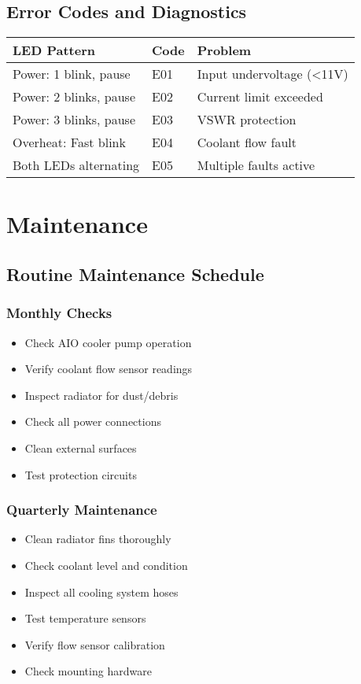 \documentclass[11pt,a4paper]{article}
\begin{document}
\subsection{Error Codes and Diagnostics}

\begin{center}
\begin{tabular}{|l|l|l|}
\hline
\textbf{LED Pattern} & \textbf{Code} & \textbf{Problem} \\
\hline
Power: 1 blink, pause & E01 & Input undervoltage (<11V) \\
Power: 2 blinks, pause & E02 & Current limit exceeded \\
Power: 3 blinks, pause & E03 & VSWR protection \\
Overheat: Fast blink & E04 & Coolant flow fault \\
Both LEDs alternating & E05 & Multiple faults active \\
\hline
\end{tabular}
\end{center}

\section{Maintenance}

\subsection{Routine Maintenance Schedule}

\subsubsection{Monthly Checks}
\begin{itemize}
    \item Check AIO cooler pump operation
    \item Verify coolant flow sensor readings
    \item Inspect radiator for dust/debris
    \item Check all power connections
    \item Clean external surfaces
    \item Test protection circuits
\end{itemize}

\subsubsection{Quarterly Maintenance}
\begin{itemize}
    \item Clean radiator fins thoroughly
    \item Check coolant level and condition
    \item Inspect all cooling system hoses
    \item Test temperature sensors
    \item Verify flow sensor calibration
    \item Check mounting hardware
\end{itemize}
\end{document}

